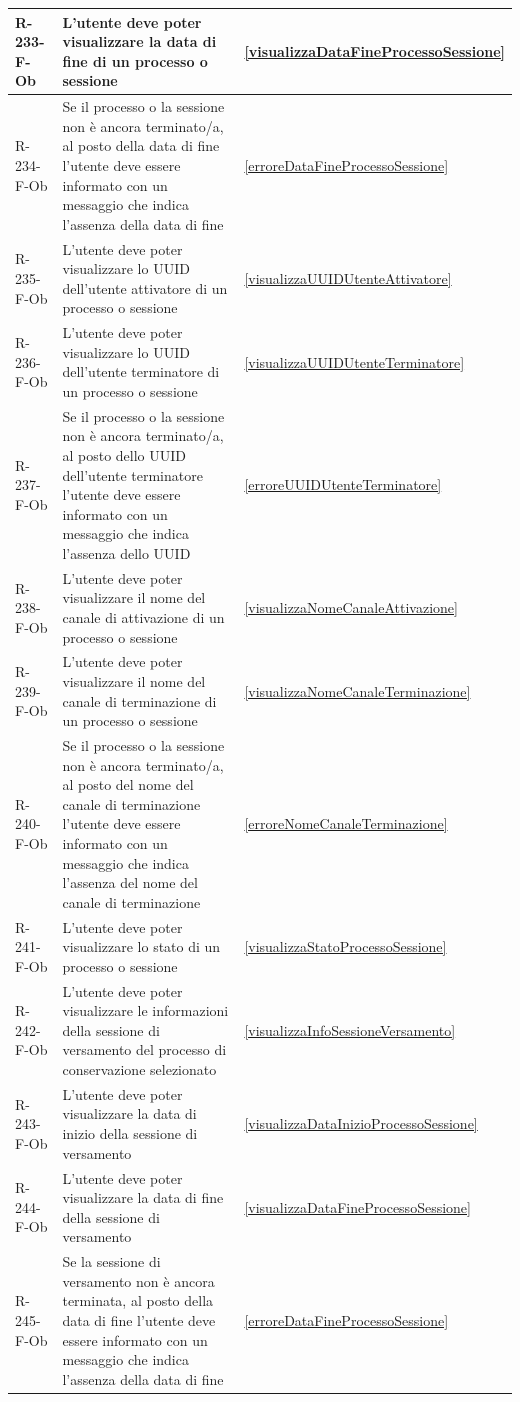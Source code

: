 \begin{longtable}{|p{2.5cm}|p{9.5cm}|p{2.5cm}|}
\hline
R-233-F-Ob & L'utente deve poter visualizzare la data di fine di un processo o sessione & \ref{visualizzaDataFineProcessoSessione} \\
\hline
R-234-F-Ob & Se il processo o la sessione non è ancora terminato/a, al posto della data di fine l'utente deve essere informato con un messaggio che indica l'assenza della data di fine & \ref{erroreDataFineProcessoSessione} \\
\hline
R-235-F-Ob & L'utente deve poter visualizzare lo UUID dell'utente attivatore di un processo o sessione & \ref{visualizzaUUIDUtenteAttivatore} \\
\hline
R-236-F-Ob & L'utente deve poter visualizzare lo UUID dell'utente terminatore di un processo o sessione & \ref{visualizzaUUIDUtenteTerminatore} \\
\hline
R-237-F-Ob & Se il processo o la sessione non è ancora terminato/a, al posto dello UUID dell'utente terminatore l'utente deve essere informato con un messaggio che indica l'assenza dello UUID & \ref{erroreUUIDUtenteTerminatore} \\
\hline
R-238-F-Ob & L'utente deve poter visualizzare il nome del canale di attivazione di un processo o sessione & \ref{visualizzaNomeCanaleAttivazione} \\
\hline
R-239-F-Ob & L'utente deve poter visualizzare il nome del canale di terminazione di un processo o sessione & \ref{visualizzaNomeCanaleTerminazione} \\
\hline
R-240-F-Ob & Se il processo o la sessione non è ancora terminato/a, al posto del nome del canale di terminazione l'utente deve essere informato con un messaggio che indica l'assenza del nome del canale di terminazione & \ref{erroreNomeCanaleTerminazione} \\
\hline
R-241-F-Ob & L'utente deve poter visualizzare lo stato di un processo o sessione & \ref{visualizzaStatoProcessoSessione} \\
\hline
R-242-F-Ob & L'utente deve poter visualizzare le informazioni della sessione di versamento del processo di conservazione selezionato & \ref{visualizzaInfoSessioneVersamento} \\
\hline
R-243-F-Ob & L'utente deve poter visualizzare la data di inizio della sessione di versamento & \ref{visualizzaDataInizioProcessoSessione} \\
\hline
R-244-F-Ob & L'utente deve poter visualizzare la data di fine della sessione di versamento & \ref{visualizzaDataFineProcessoSessione} \\
\hline
R-245-F-Ob & Se la sessione di versamento non è ancora terminata, al posto della data di fine l'utente deve essere informato con un messaggio che indica l'assenza della data di fine & \ref{erroreDataFineProcessoSessione} \\

\end{longtable}
